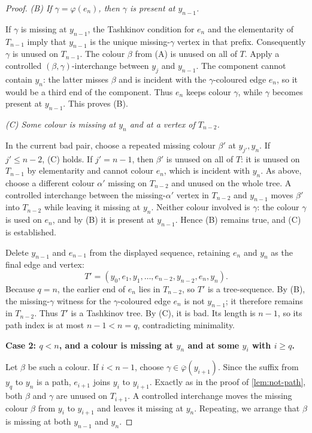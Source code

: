 \documentclass[11pt]{article}
\theoremstyle{definition}
\newcommand{\missing}[1]{\overline{#1}}
\begin{document}
\begin{proof}
\smallskip
\emph{(B) If $\gamma=\varphi(e_n)$, then $\gamma$ is present at
$y_{n-1}$.}

If $\gamma$ is missing at $y_{n-1}$, the Tashkinov condition for $e_n$ and the
elementarity of $T_{n-1}$ imply that $y_{n-1}$ is the unique missing-$\gamma$
vertex in that prefix.  Consequently $\gamma$ is unused on $T_{n-1}$.  The
colour $\beta$ from (A) is unused on all of $T$.  Apply a controlled
$(\beta,\gamma)$-interchange between $y_j$ and $y_{n-1}$.  The component cannot
contain $y_n$: the latter misses $\beta$ and is incident with the
$\gamma$-coloured edge $e_n$, so it would be a third end of the component.
Thus $e_n$ keeps colour $\gamma$, while $\gamma$ becomes present at
$y_{n-1}$.  This proves (B).

\smallskip
\emph{(C) Some colour is missing at $y_n$ and at a vertex of
$T_{n-2}$.}

In the current bad pair, choose a repeated missing colour $\beta'$ at
$y_{j'},y_n$.  If $j'\le n-2$, (C) holds.  If $j'=n-1$, then $\beta'$ is
unused on all of $T$: it is unused on $T_{n-1}$ by elementarity and cannot
colour $e_n$, which is incident with $y_n$.  As above, choose a different
colour $\alpha'$ missing on $T_{n-2}$ and unused on the whole tree.  A
controlled interchange between the missing-$\alpha'$ vertex in $T_{n-2}$ and
$y_{n-1}$ moves $\beta'$ into $T_{n-2}$ while leaving it missing at $y_n$.
Neither colour involved is $\gamma$: the colour $\gamma$ is used on $e_n$, and
by (B) it is present at $y_{n-1}$.  Hence (B) remains true, and (C) is
established.

Delete $y_{n-1}$ and $e_{n-1}$ from the displayed sequence, retaining $e_n$
and $y_n$ as the final edge and vertex:
\[
  T'=(y_0,e_1,y_1,\ldots,e_{n-2},y_{n-2},e_n,y_n).
\]
Because $q=n$, the earlier end of $e_n$ lies in $T_{n-2}$, so $T'$ is a
tree-sequence.  By (B), the missing-$\gamma$ witness for the
$\gamma$-coloured edge $e_n$ is not $y_{n-1}$; it therefore remains in
$T_{n-2}$.  Thus $T'$ is a Tashkinov tree.  By (C), it is bad.  Its length is
$n-1$, so its path index is at most $n-1<n=q$, contradicting minimality.

\medskip
\noindent\textbf{Case 2: $q<n$, and a colour is missing at $y_n$ and at
some $y_i$ with $i\ge q$.}

Let $\beta$ be such a colour.  If $i<n-1$, choose
$\gamma\in\missing\varphi(y_{i+1})$.  Since the suffix from $y_q$ to $y_n$ is
a path, $e_{i+1}$ joins $y_i$ to $y_{i+1}$.  Exactly as in the proof of
\cref{lem:not-path}, both $\beta$ and $\gamma$ are unused on $T_{i+1}$.
A controlled interchange moves the missing colour $\beta$ from $y_i$ to
$y_{i+1}$ and leaves it missing at $y_n$.  Repeating, we arrange that
$\beta$ is missing at both $y_{n-1}$ and $y_n$.


\end{proof}
\end{document}
